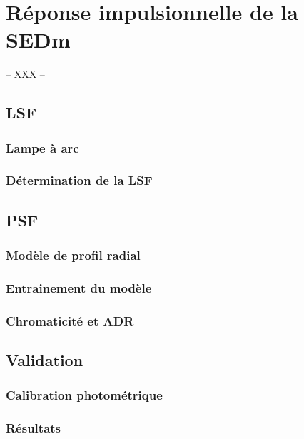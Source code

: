 \documentclass[../main/main.tex]{subfiles}
\begin{document}
\chapter{Réponse impulsionnelle de la SEDm}\label{ch:irf}

-- XXX --

\minitoc
\newpage

\section{LSF}

\subsection{Lampe à arc}

\subsection{Détermination de la LSF}

\section{PSF}

\subsection{Modèle de profil radial}

\subsection{Entrainement du modèle}

\subsection{Chromaticité et ADR}

\section{Validation}

\subsection{Calibration photométrique}

\subsection{Résultats}
\end{document}
